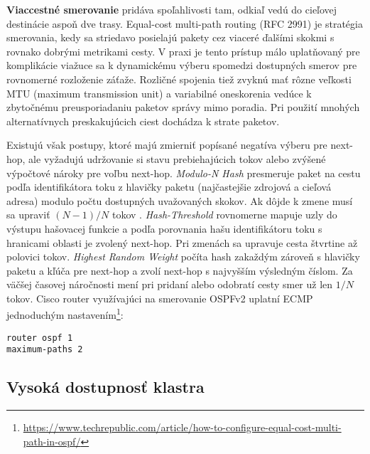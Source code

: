 \documentclass[12pt, a4paper]{article}
\begin{document}
\textbf{Viaccestné smerovanie} pridáva spoľahlivosti tam, odkiaľ vedú do cieľovej destinácie aspoň
dve trasy. Equal-cost multi-path routing (RFC 2991) je stratégia smerovania, kedy sa striedavo posielajú 
pakety cez viaceré ďalšími skokmi s rovnako dobrými metrikami cesty. V praxi je tento prístup málo 
uplatňovaný pre komplikácie viažuce sa k dynamickému výberu spomedzi dostupných smerov pre rovnomerné 
rozloženie záťaže. Rozličné spojenia tiež zvyknú mať rôzne veľkosti MTU (maximum transmission unit) a 
variabilné oneskorenia vedúce k zbytočnému preusporiadaniu paketov správy mimo poradia. Pri použití mnohých
alternatívnych preskakujúcich ciest dochádza k strate paketov. 

Existujú však postupy, ktoré majú zmierniť popísané negatíva výberu pre next-hop, ale vyžadujú udržovanie si 
stavu prebiehajúcich tokov alebo zvýšené výpočtové nároky pre voľbu next-hop. \emph{Modulo-N Hash} 
presmeruje paket na cestu podľa identifikátora toku z hlavičky paketu (najčastejšie zdrojová a cieľová 
adresa) modulo počtu dostupných uvažovaných skokov. Ak dôjde k zmene musí sa upraviť $(N-1)/N$ tokov
 \cite{RFC2991}. \emph{Hash-Threshold} rovnomerne mapuje uzly do výstupu hašovacej funkcie a podľa 
porovnania hašu identifikátoru toku s hranicami oblasti je zvolený next-hop. Pri zmenách sa upravuje cesta 
štvrtine až polovici tokov. \emph{Highest Random Weight} počíta hash zakaždým zároveň s hlavičky paketu a
kľúča pre next-hop a zvolí next-hop s najvyšším výsledným číslom. Za väčšej časovej náročnosti
mení pri pridaní alebo odobratí cesty smer už len $1/N$ tokov. Cisco router využívajúci na smerovanie
OSPFv2 uplatní ECMP jednoduchým nastavením\footnote{\url{https://www.techrepublic.com/article/how-to-configure-equal-cost-multi-path-in-ospf/}}:
\begin{lstlisting}
router ospf 1
maximum-paths 2
\end{lstlisting}

\subsection{Vysoká dostupnosť klastra}
\end{document}
